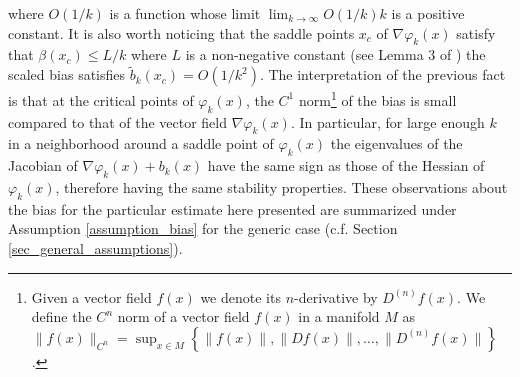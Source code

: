 \documentclass[article]{IEEEtran}
\theoremstyle{definition}
\begin{document}
%
where $O(1/k)$ is a function whose limit $\lim_{k\to \infty} O(1/k)k$ is a positive constant. It is also worth noticing that the saddle points $x_c$ of $\nabla \varphi_k(x)$ satisfy that $\beta(x_c)\leq L/k$ where $L$ is a non-negative constant (see Lemma 3 of \cite{PaternainEtal15}) the scaled bias satisfies $\tilde{b}_k(x_c) =O(1/k^2)$. The interpretation of the previous fact is that at the critical points of $\varphi_k(x)$, the $C^1$ norm\footnote{Given a vector field $f(x)$ we denote its $n$-derivative by $D^{(n)}f(x)$. We define the $C^n$ norm of a vector field $f(x)$ in a manifold $M$ as $\|f(x)\|_{C^n}=\sup_{x\in M}\left\{\|f(x)\|,\|Df(x)\|,\ldots, \|D^{(n)}f(x)\| \right\}$.} of the bias is small compared to that of the vector field $\nabla \varphi_k(x)$. In particular, for large enough $k$ in a neighborhood around a saddle point of $\varphi_k(x)$ the eigenvalues of the Jacobian of $\nabla \varphi_k(x) +b_k(x)$ have the same sign as those of the Hessian of $\varphi_k(x)$, therefore having the same stability properties. These observations about the bias for the particular estimate here presented are summarized under Assumption \ref{assumption_bias} for the generic case (c.f. Section \ref{sec_general_assumptions}). 
%
\end{document}
